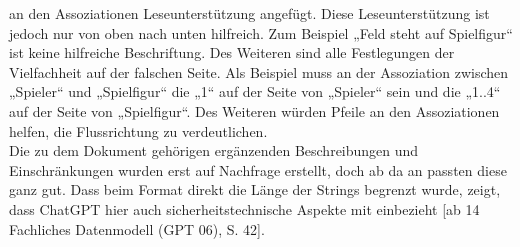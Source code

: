 an den Assoziationen Leseunterstützung angefügt. Diese Leseunterstützung ist jedoch nur von oben nach unten hilfreich. Zum Beispiel 
„Feld steht auf Spielfigur“ ist keine hilfreiche Beschriftung. Des Weiteren sind alle Festlegungen der Vielfachheit auf der falschen 
Seite. Als Beispiel muss an der Assoziation zwischen „Spieler“ und „Spielfigur“ die „1“ auf der Seite von „Spieler“ sein und die 
„1..4“ auf der Seite von „Spielfigur“. Des Weiteren würden Pfeile an den Assoziationen helfen, die Flussrichtung zu verdeutlichen.\\
Die zu dem Dokument gehörigen ergänzenden Beschreibungen und Einschränkungen wurden erst auf Nachfrage erstellt, doch ab da an 
passten diese ganz gut. Dass beim Format direkt die Länge der Strings begrenzt wurde, zeigt, dass ChatGPT hier auch sicherheitstechnische 
Aspekte mit einbezieht [ab 14 Fachliches Datenmodell (GPT 06), S. 42].

